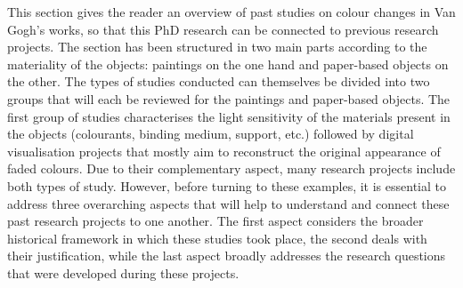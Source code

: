 This section gives the reader an overview of past studies on colour changes in Van Gogh's works, so that this PhD research can be connected to previous research projects. The section has been structured in two main parts according to the materiality of the objects: paintings on the one hand and paper-based objects on the other. The types of studies conducted can themselves be divided into two groups that will each be reviewed for the paintings and paper-based objects. The first group of studies characterises the light sensitivity of the materials present in the objects (colourants, binding medium, support, etc.) followed by digital visualisation projects that mostly aim to reconstruct the original appearance of faded colours. Due to their complementary aspect, many research projects include both types of study. However, before turning to these examples, it is essential to address three overarching aspects that will help to understand and connect these past research projects to one another. The first aspect considers the broader historical framework in which these studies took place, the second deals with their justification, while the last aspect broadly addresses the research questions that were developed during these projects. \\

